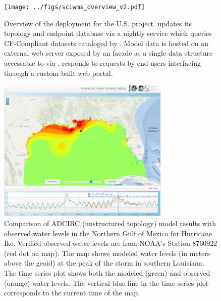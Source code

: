 \else
\begin{figure}[ht!]
  \centering
  \texttt{[image: ../figs/sciwms\_overview\_v2.pdf]}
  \caption{Overview of the \sciwms{} deployment for the U.S. \ioos{}
    \comt{} project. \Sciwms{} updates its topology and endpoint
    database via a nightly service which queries CF-Compliant datasets
    cataloged by \ngdc{}. Model data is hosted on an external web
    server exposed by an \ncml{} facade as a single \netcdf{} data
    structure accessable to \sciwms{} via \opendap{}. \Sciwms{}
    responds to requests by end users interfacing through a custom built
    web portal.}
  \label{fig:overview1}
\end{figure}
\begin{figure}[ht!]
  \centering
  \includegraphics[height=2.7in]{../figs/SciWMS_ModelObsComparison_crop_373_8_1052_879}
  \caption{Comparison of ADCIRC (unstructured topology) model results
    with observed water levels in the Northern Gulf of Mexico for
    Hurricane Ike. Verified observed water levels are from NOAA's
    Station 8760922 (red dot on map). The map shows modeled water
    levels (in meters above the geoid) at the peak of the storm in
    southern Louisiana. The time series plot shows both the modeled
    (green) and observed (orange) water levels. The vertical blue line
    in the time series plot corresponds to the current time of the
    map.}
  \label{fig:adcirc_comp}
\end{figure}
\fi


